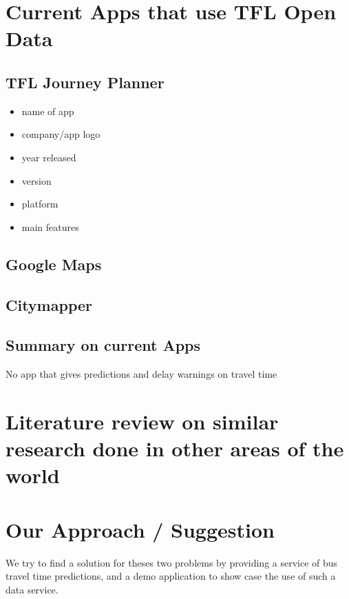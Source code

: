 \section{Current Apps that use TFL Open Data}

\subsection{TFL Journey Planner}

\begin{itemize}
  \item name of app
  \item company/app logo
  \item year released
  \item version
  \item platform
  \item main features
\end{itemize}

\subsection{Google Maps}

\subsection{Citymapper}

\subsection{Summary on current Apps}
No app that gives predictions and delay warnings on travel time

\section{
Literature review on similar research done in other areas of the world}


\section{Our Approach / Suggestion}
We try to find a solution for theses two problems by providing a service of bus travel time predictions, and a demo application to show case the use of such a data service.




